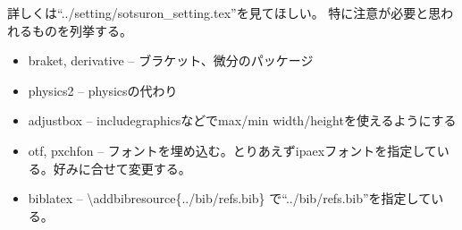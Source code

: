 \documentclass[uplatex, a4paper, dvipdfmx, 12pt]{jsreport}
\begin{document}
\newcommand\tbs{\textbackslash}
\newcommand{\warn}[1]{\textcolor{red}{#1}}
\tableofcontents%

		詳しくは``../setting/sotsuron\_setting.tex''を見てほしい。
		特に注意が必要と思われるものを列挙する。
		\begin{itemize}
			\item braket, derivative -- ブラケット、微分のパッケージ
			\item physics2 -- physicsの代わり
			\item adjustbox -- includegraphicsなどでmax/min width/heightを使えるようにする
			\item otf, pxchfon -- フォントを埋め込む。とりあえずipaexフォントを指定している。好みに合せて変更する。
			\item biblatex -- \tbs addbibresource\{../bib/refs.bib\} で``../bib/refs.bib''を指定している。
		\end{itemize}
\end{document}
